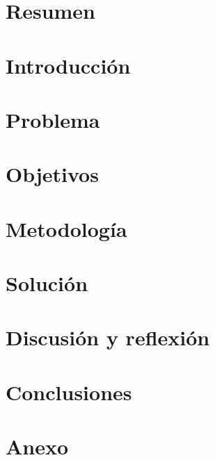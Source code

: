 \documentclass[12pt]{article}
\begin{document}

\tableofcontents
\pagebreak


\section{Resumen}
\section{Introducción}
\section{Problema}
\section{Objetivos}
\section{Metodología}
\section{Solución}
\section{Discusión y reflexión}
\section{Conclusiones}
\section{Anexo}
\end{document}
